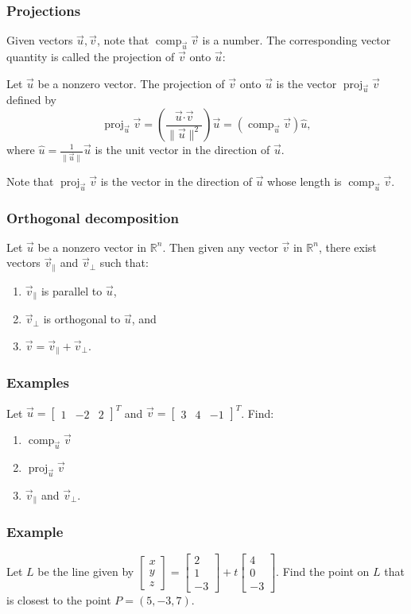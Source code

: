 \documentclass[11pt,t]{beamer}
\newcommand{\R}{\mathbb{R}}
\newcommand{\len}[1]{\lVert #1\rVert}
\newcommand{\dotp}{\boldsymbol{\cdot}}
\newcommand{\comp}[2]{\operatorname{comp}_{\vec{#1}}\vec{#2}}
\newcommand{\proj}[2]{\operatorname{proj}_{\vec{#1}}\vec{#2}}
\begin{document}
\begin{frame}
\frametitle{Projections}

Given vectors $\vec{u},\vec{v}$, note that $\comp{u}{v}$ is a \alert{number}. The corresponding \alert{vector} quantity is called the projection of $\vec{v}$ onto $\vec{u}$:
\begin{definition}
Let $\vec{u}$ be a nonzero vector. The \alert{projection} of $\vec{v}$ onto $\vec{u}$ is the vector $\proj{u}{v}$ defined by
\[
\proj{u}{v} = \left(\frac{\vec{u}\dotp\vec{v}}{\len{\vec{u}}^2}\right)\vec{u} = (\comp{u}{v})\hat{u},
\]
where $\hat{u} = \frac{1}{\len{\vec{u}}}\vec{u}$ is the unit vector in the direction of $\vec{u}$.
\end{definition}
Note that $\proj{u}{v}$ is the vector in the direction of $\vec{u}$ whose length is $\comp{u}{v}$.
\end{frame}
\begin{frame}
\frametitle{Orthogonal decomposition}
\begin{theorem}
Let $\vec{u}$ be a nonzero vector  in $\R^n$. Then given any vector $\vec{v}$ in $\R^n$, there exist vectors $\vec{v}_{\parallel}$ and $\vec{v}_{\perp}$ such that:
\begin{enumerate}
\item $\vec{v}_{\parallel}$ is parallel to $\vec{u}$,
\item $\vec{v}_{\perp}$ is orthogonal to $\vec{u}$, and
\item $\vec{v} = \vec{v}_\parallel+\vec{v}_\perp$.
\end{enumerate}
\end{theorem}
\end{frame}
\begin{frame}
\frametitle{Examples}
Let $\vec{u} = \begin{bmatrix}1&-2&2\end{bmatrix}^T$ and $\vec{v} = \begin{bmatrix}3&4&-1\end{bmatrix}^T$. Find:
\begin{enumerate}
\item $\comp{u}{v}$
\item $\proj{u}{v}$
\item $\vec{v}_\parallel$ and $\vec{v}_\perp$.
\end{enumerate}
\end{frame}
\begin{frame}
\frametitle{Example}

Let $L$ be the line given by $\begin{bmatrix}
x\\y\\z
\end{bmatrix} = \begin{bmatrix}
2\\1\\-3
\end{bmatrix}+t\begin{bmatrix}
4\\0\\-3
\end{bmatrix}.$ Find the point on $L$ that is closest to the point $P=(5,-3,7)$.
\end{frame}
\end{document}
